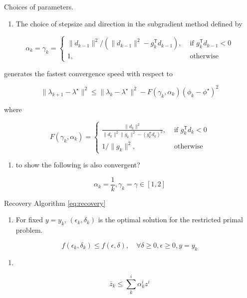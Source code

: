\begin{theorem} Choices of parameters.

  \begin{enumerate}
    \def\labelenumi{(\alph{enumi})}
    \tightlist
    \item
          The choice of stepsize and direction in the subgradient method defined
          by
  \end{enumerate}

  \[\alpha_{k}=\gamma_{k}=\begin{cases}\|d_{k-1}\|^2 /(\|d_{k-1}\|^2- g_{k}^\mathsf{T} d_{k-1}), & \text { if } g_{k}^\mathsf{T} d_{k-1} <0 \\ 1, & \text { otherwise }\end{cases}\]

  generates the fastest convergence speed with respect to

  \[\|\lambda_{k+1}-\lambda^\star\|^{2} \leqslant\|\lambda_{k}-\lambda^\star\|^{2}-F(\gamma_{k}, \alpha_{k})(\phi_k-\phi^\star)^{2}\]

  where

  \[F(\gamma_{k}, \alpha_{k})=\begin{cases}
      \frac{\|d_k\|^2}{\|d_k\|^2 \|g_k\|^2-(g_k^\mathsf{T} d_k)^{2}}, & \textrm { if } g_k^\mathsf{T} d_k <0 \\
      1/\|g_k\|^2,                                                    & \text { otherwise }\end{cases}\]

  \begin{enumerate}
    \def\labelenumi{(\alph{enumi})}
    \setcounter{enumi}{1}
    \tightlist
    \item
          to show the following is also convergent?
  \end{enumerate}

  \[\alpha_k = \frac{1}{k}, \gamma_k = \gamma \in [1, 2]\]


\end{theorem}

\begin{theorem} \label{lemma:recovery}  Recovery Algorithm \eqref{eq:recovery}
  \begin{enumerate}
    \def\labelenumi{(\alph{enumi})}
    \tightlist
    \item
          For fixed \(y=y_k\), \((\epsilon_k, \delta_k)\) is the optimal
          solution for the restricted primal problem.
  \end{enumerate}

  \[f(\epsilon_k, \delta_k) \le f(\epsilon, \delta), \quad \forall \delta\ge 0, \epsilon\ge 0, y= y_k\]

  \begin{enumerate}
    \def\labelenumi{(\alph{enumi})}
    \setcounter{enumi}{1}
    \tightlist
    \item
  \end{enumerate}

  \[\bar z_k \le \sum^i_k \alpha^i_k z^i\]
\end{theorem}

